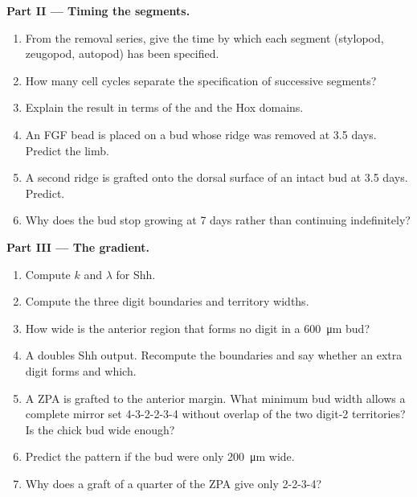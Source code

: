 \begin{problem}
\medskip
\noindent\textbf{Part II --- Timing the segments.}
\begin{enumerate}[resume]
  \item From the removal series, give the time by which each segment
        (stylopod, zeugopod, autopod) has been specified.
  \item How many cell cycles separate the specification of
        successive segments?
  \item Explain the result in terms of the  and the
        Hox domains.
  \item An FGF bead is placed on a bud whose ridge was removed at 3.5
        days. Predict the limb.
  \item A second ridge is grafted onto the dorsal surface of an
        intact bud at 3.5 days. Predict.
  \item Why does the bud stop growing at 7 days rather than
        continuing indefinitely?
\end{enumerate}

\medskip
\noindent\textbf{Part III --- The gradient.}
\begin{enumerate}[resume]
  \item Compute $k$ and $\lambda$ for Shh.
  \item Compute the three digit boundaries and territory widths.
  \item How wide is the anterior region that forms no digit in a
        \qty{600}{\micro m} bud?
  \item A  doubles Shh output. Recompute the boundaries and
        say whether an extra digit forms and which.
  \item A ZPA is grafted to the anterior margin. What minimum bud
        width allows a complete mirror set 4-3-2-2-3-4 without
        overlap of the two digit-2 territories? Is the chick bud wide
        enough?
  \item Predict the pattern if the bud were only \qty{200}{\micro m}
        wide.
  \item Why does a graft of a quarter of the ZPA give only 2-2-3-4?
\end{enumerate}


\end{problem}
